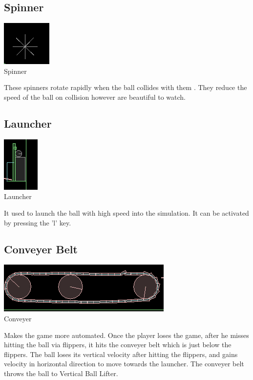 \documentclass[11pt]{article}
\begin{document}
\subsection{Spinner}
\begin{center}
\includegraphics[scale=0.5]{../plots/spinner.png}\\
Spinner
\end{center}
These spinners rotate rapidly when the ball collides with them . They reduce the speed of the ball on collision however are beautiful to watch.

\subsection{Launcher}
\begin{center}
\includegraphics[scale=0.5]{../plots/launcher.png}\\
Launcher
\end{center}
It used to launch the ball with high speed into the simulation. It can be activated by pressing the 'l' key.

\subsection{Conveyer Belt}
\begin{center}
\includegraphics[scale=0.5]{../plots/conveyer.png}\\
Conveyer
\end{center}
Makes the game more automated. Once the player loses the game, after he misses hitting the ball via flippers, it hits the conveyer belt which is just below the flippers. The ball loses its vertical velocity after hitting the flippers, and gains velocity in horizontal direction to move towards the launcher. The conveyer belt throws the ball to Vertical Ball Lifter.
\end{document}
